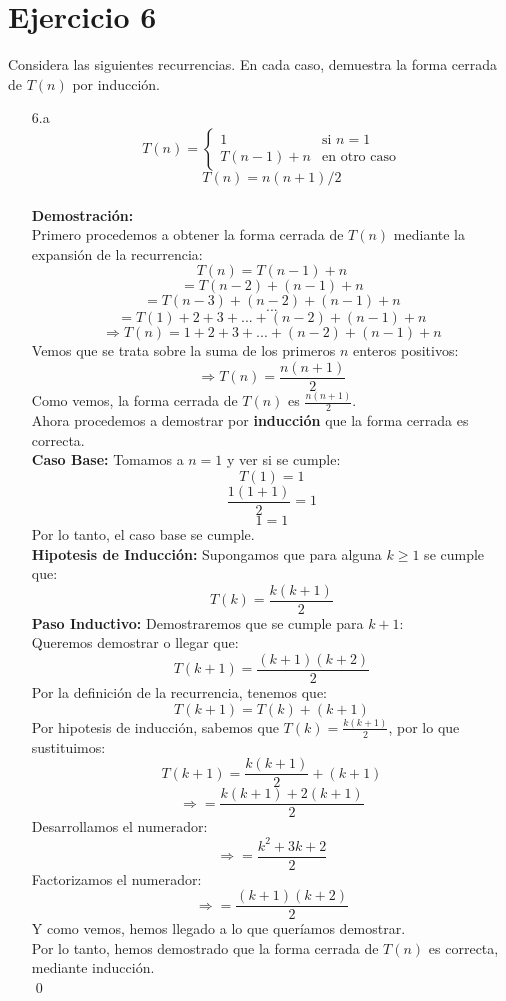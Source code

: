 \documentclass[12pt]{article}
\begin{document}
\section*{Ejercicio 6}
Considera las siguientes recurrencias. En cada caso, demuestra la forma cerrada de $T(n)$ por inducción.
\begin{itemize}
    \item[6.a]  
    \[
        T(n) = \left\{ \begin{array}{ll}
        1 & \text{si } n=1\\ T(n-1)+n & \text{en otro caso} \end{array}\right.
    \]
    \[
        T(n) = n(n+1)/2
    \]
    \\\textbf{Demostración:}\\
    Primero procedemos a obtener la forma cerrada de $T(n)$ mediante la expansión de la recurrencia:
    \[
        T(n) = T(n-1) + n
    \]
    \[
        = T(n-2) + (n-1) + n
    \]
    \[
        = T(n-3) + (n-2) + (n-1) + n
    \]
    \[
        ...
    \]
    \[
        = T(1) + 2 + 3 + ... + (n-2) + (n-1) + n
    \]
    \[
    \Rightarrow T(n) = 1 + 2 + 3 + ... + (n-2) + (n-1) + n 
    \]
    Vemos que se trata sobre la suma de los primeros $n$ enteros positivos:
    \[
    \Rightarrow T(n) = \frac{n(n+1)}{2}
    \]
    Como vemos, la forma cerrada de $T(n)$ es $\frac{n(n+1)}{2}$.\\
    Ahora procedemos a demostrar por \textbf{inducción} que la forma cerrada es correcta.\\
    \textbf{Caso Base:} Tomamos a $n = 1$ y ver si se cumple:
    \[
        T(1) = 1
    \]
    \[
        \frac{1(1+1)}{2} = 1
    \]
    \[
        1 = 1
    \]
    Por lo tanto, el caso base se cumple.\\
    \textbf{Hipotesis de Inducción:} Supongamos que para alguna $k \geq 1$ se cumple que:
    \[
        T(k) = \frac{k(k+1)}{2}
    \]
    \textbf{Paso Inductivo:} Demostraremos que se cumple para $k + 1$:\\
    Queremos demostrar o llegar que: 
    \[
        T(k+1) = \frac{(k+1)(k+2)}{2}
    \]
    Por la definición de la recurrencia, tenemos que:
    \[
        T(k+1) = T(k) + (k + 1)
    \]
    Por hipotesis de inducción, sabemos que $T(k) = \frac{k(k+1)}{2}$, por lo que sustituimos:
    \[
        T(k+1) = \frac{k(k+1)}{2} + (k + 1)
    \]
    \[
        \Rightarrow = \frac{k(k+1)+2(k + 1)}{2} 
    \] 
    Desarrollamos el numerador:
    \[
        \Rightarrow = \frac{k^2 + 3k + 2}{2}
    \]
    Factorizamos el numerador:
    \[
        \Rightarrow = \frac{(k+1)(k+2)}{2}
    \]
    Y como vemos, hemos llegado a lo que queríamos demostrar.\\
    Por lo tanto, hemos demostrado que la forma cerrada de $T(n)$ es correcta, mediante inducción.\\
    \qed



\end{itemize}
\end{document}
